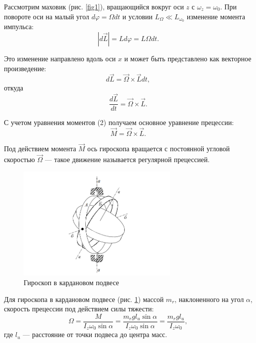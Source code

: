\documentclass[a4paper, 12pt]{article}
\begin{document}
Рассмотрим маховик (рис. \ref{fig1}), вращающийся вокруг оси $z$ с $\omega_z = \omega_0$. При повороте оси на малый угол $d\varphi = \Omega dt$ и условии $L_\Omega \ll L_{\omega_0}$ изменение момента импульса:
\begin{equation}
|d\vec{L}| = L d\varphi = L \Omega dt.
\end{equation}

Это изменение направлено вдоль оси $x$ и может быть представлено как векторное произведение:
\begin{equation}
d\vec{L} = \vec{\Omega} \times \vec{L} dt,
\end{equation}
откуда
\begin{equation}
\frac{d\vec{L}}{dt} = \vec{\Omega} \times \vec{L}.
\end{equation}

С учетом уравнения моментов (2) получаем основное уравнение прецессии:
\begin{equation}
\vec{M} = \vec{\Omega} \times \vec{L}.
\end{equation}

Под действием момента $\vec{M}$ ось гироскопа вращается с постоянной угловой скоростью $\vec{\Omega}$ — такое движение называется регулярной прецессией.

\begin{figure}[h]
\centering
\includegraphics[width=0.7\textwidth]{рис2.png}
\caption{Гироскоп в кардановом подвесе}
\label{fig2}
\end{figure}

Для гироскопа в кардановом подвесе (рис. \ref{fig2}) массой $m_r$, наклоненного на угол $\alpha$, скорость прецессии под действием силы тяжести:
\begin{equation}
\Omega = \frac{M}{I_z \omega_0 \sin \alpha} = \frac{m_r g l_{u} \sin \alpha}{I_z \omega_0 \sin \alpha} = \frac{m_r g l_{u}}{I_z \omega_0},
\end{equation}
где $l_u$ — расстояние от точки подвеса до центра масс.
\end{document}
